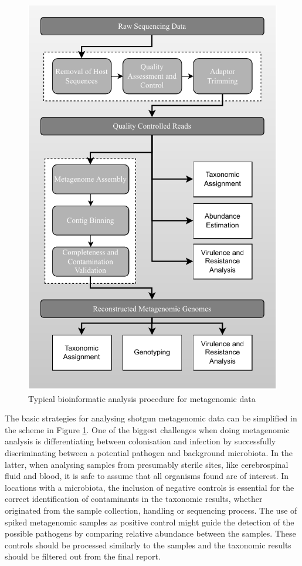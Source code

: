 \begin{figure}[h!]
\centering
\includegraphics[]{figures/introduction/Figure9.pdf}
\caption{Typical bioinformatic analysis procedure for metagenomic data}
\label{fig:figure9}
\end{figure}

The basic strategies for analysing shotgun metagenomic data can be simplified in the scheme in Figure \ref{fig:figure9}. 
One of the biggest challenges when doing metagenomic analysis is differentiating between colonisation and infection by successfully discriminating between a potential pathogen and background microbiota. 
In the latter, when analysing samples from presumably sterile sites, like cerebrospinal fluid and blood, it is safe to assume that all organisms found are of interest. 
In locations with a microbiota, the inclusion of negative controls is essential for the correct identification of contaminants in the taxonomic results, whether originated from the sample collection, handling or sequencing process. 
The use of spiked metagenomic samples as positive control might guide the detection of the possible pathogens by comparing relative abundance between the samples. 
These controls should be processed similarly to the samples and the taxonomic results should be filtered out from the final report. 

